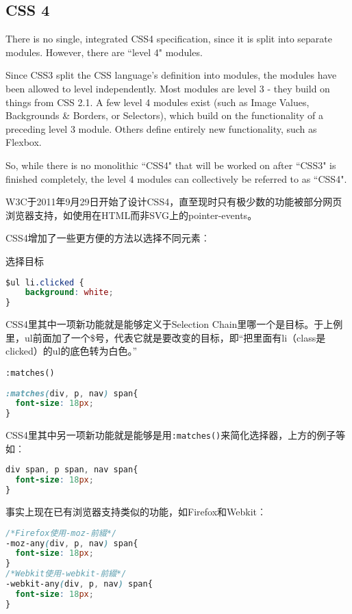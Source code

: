 \subsection{CSS 4}

There is no single, integrated CSS4 specification, since it is split into separate modules. However, there are ``level 4" modules.

Since CSS3 split the CSS language's definition into modules, the modules have been allowed to level independently. Most modules are level 3 - they build on things from CSS 2.1. A few level 4 modules exist (such as Image Values, Backgrounds \& Borders, or Selectors), which build on the functionality of a preceding level 3 module. Others define entirely new functionality, such as Flexbox.

So, while there is no monolithic ``CSS4" that will be worked on after ``CSS3" is finished completely, the level 4 modules can collectively be referred to as ``CSS4".

W3C于2011年9月29日开始了设计CSS4，直至现时只有极少数的功能被部分网页浏览器支持，如使用在HTML而非SVG上的pointer-events。


CSS4增加了一些更方便的方法以选择不同元素︰

\begin{compactitem}
\item 选择目标

\begin{lstlisting}[language=CSS]
$ul li.clicked {
    background: white;
}
\end{lstlisting}

CSS4里其中一项新功能就是能够定义于Selection Chain里哪一个是目标。于上例里，ul前面加了一个\$号，代表它就是要改变的目标，即“把里面有li（class是clicked）的ul的底色转为白色。”






\item \texttt{:matches()}


\begin{lstlisting}[language=CSS]
:matches(div, p, nav) span{
  font-size: 18px;
}
\end{lstlisting}

CSS4里其中另一项新功能就是能够是用\texttt{:matches()}来简化选择器，上方的例子等如︰

\begin{lstlisting}[language=CSS]
div span, p span, nav span{
  font-size: 18px;
}
\end{lstlisting}

事实上现在已有浏览器支持类似的功能，如Firefox和Webkit︰


\begin{lstlisting}[language=CSS]
/*Firefox使用-moz-前綴*/
-moz-any(div, p, nav) span{
  font-size: 18px;
}
/*Webkit使用-webkit-前綴*/
-webkit-any(div, p, nav) span{
  font-size: 18px;
}
\end{lstlisting}


\end{compactitem}



